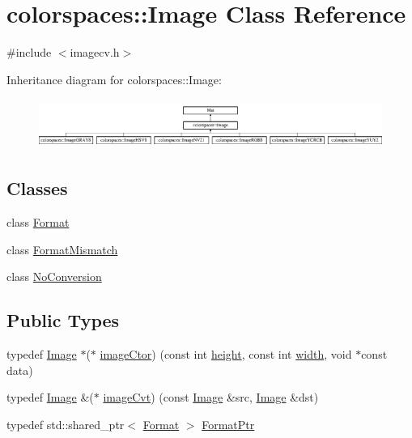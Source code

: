 \hypertarget{classcolorspaces_1_1_image}{}\section{colorspaces\+:\+:Image Class Reference}
\label{classcolorspaces_1_1_image}


{\ttfamily \#include $<$imagecv.\+h$>$}

Inheritance diagram for colorspaces\+:\+:Image\+:\begin{figure}[H]
\begin{center}
\leavevmode
\includegraphics[height=1.637427cm]{classcolorspaces_1_1_image}
\end{center}
\end{figure}
\subsection*{Classes}
\begin{DoxyCompactItemize}
\item 
class \hyperlink{classcolorspaces_1_1_image_1_1_format}{Format}
\item 
class \hyperlink{classcolorspaces_1_1_image_1_1_format_mismatch}{Format\+Mismatch}
\item 
class \hyperlink{classcolorspaces_1_1_image_1_1_no_conversion}{No\+Conversion}
\end{DoxyCompactItemize}
\subsection*{Public Types}
\begin{DoxyCompactItemize}
\item 
typedef \hyperlink{classcolorspaces_1_1_image}{Image} $\ast$($\ast$ \hyperlink{classcolorspaces_1_1_image_a5d086f8bb03d6eab9c3accfd0040e28d}{image\+Ctor}) (const int \hyperlink{classcolorspaces_1_1_image_a99a05ebd37f61215b2c3042ecaefdbfc}{height}, const int \hyperlink{classcolorspaces_1_1_image_ab80af7d4797110c23ed575b329ec7c4f}{width}, void $\ast$const data)
\item 
typedef \hyperlink{classcolorspaces_1_1_image}{Image} \&($\ast$ \hyperlink{classcolorspaces_1_1_image_a8d8b6c8b517caac4cb685f4d73e2c8dc}{image\+Cvt}) (const \hyperlink{classcolorspaces_1_1_image}{Image} \&src, \hyperlink{classcolorspaces_1_1_image}{Image} \&dst)
\item 
typedef std\+::shared\+\_\+ptr$<$ \hyperlink{classcolorspaces_1_1_image_1_1_format}{Format} $>$ \hyperlink{classcolorspaces_1_1_image_ab3978cc7acc2b5e855f8c715f09667d1}{Format\+Ptr}
\end{DoxyCompactItemize}

